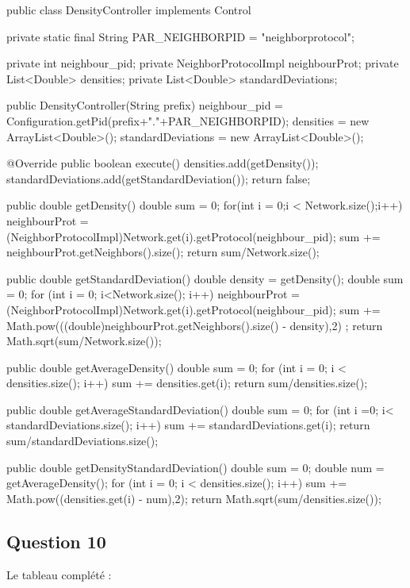 \documentclass[10pt]{report}
\begin{document}
\begin{boxedlisting}
public class DensityController implements Control{
	private static final String PAR_NEIGHBORPID = "neighborprotocol";

	private int neighbour_pid;
	private NeighborProtocolImpl neighbourProt;
	private List<Double> densities;
	private List<Double> standardDeviations;
	
	public DensityController(String prefix) {
		neighbour_pid = Configuration.getPid(prefix+"."+PAR_NEIGHBORPID);
		densities = new ArrayList<Double>();
		standardDeviations  = new ArrayList<Double>();
	}

	@Override
	public boolean execute() {
		densities.add(getDensity());
		standardDeviations.add(getStandardDeviation());
		return false;
	}

	public double getDensity() {
		double sum = 0;
		for(int i = 0;i < Network.size();i++) {
			neighbourProt = (NeighborProtocolImpl)Network.get(i).getProtocol(neighbour_pid);
			sum += neighbourProt.getNeighbors().size();
		}
		return sum/Network.size();
	}
	
	public double getStandardDeviation() {
		double density = getDensity();
		double sum = 0;
		for (int i = 0; i<Network.size(); i++) {
			neighbourProt = (NeighborProtocolImpl)Network.get(i).getProtocol(neighbour_pid);
			 sum += Math.pow(((double)neighbourProt.getNeighbors().size() - density),2) ;
		}
		return Math.sqrt(sum/Network.size());
	}
	
	public double getAverageDensity() {
		double sum = 0;
		for (int i = 0; i < densities.size(); i++) {
			sum += densities.get(i);
		}
		return sum/densities.size();
	}
	
	public double getAverageStandardDeviation() {
		double sum = 0;
		for (int i =0; i< standardDeviations.size(); i++) {
			sum += standardDeviations.get(i);
		}
		return sum/standardDeviations.size();
	}
	
	public double getDensityStandardDeviation() {
		double sum = 0;
		double num = getAverageDensity();
		for (int i = 0; i < densities.size(); i++) {
			sum += Math.pow((densities.get(i) - num),2);
		}
		return Math.sqrt(sum/densities.size());
	}	
}
\end{boxedlisting}

\subsection{Question 10}

Le tableau complété :\\
\end{document}
